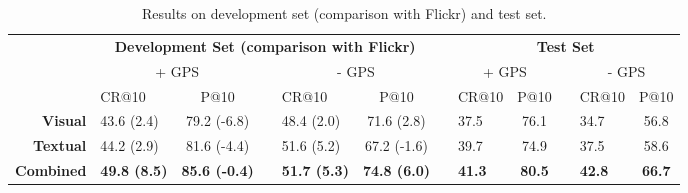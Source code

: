 \documentclass{acm_proc_article-me11_tweaked}
\begin{document}
\begin{table*}
\centering
\caption{Results on development set (comparison with Flickr) and test set.}
 \begin{tabular}{|r|l|ccl|ccl|ccl|c|}
\cline{2-12}
   \multicolumn{1}{c|}{ } & \multicolumn{5}{c}{\bfseries Development Set (comparison with Flickr)}  & \vrule height2.75ex depth1.25ex width 1pt &  \multicolumn{5}{c|}{\bfseries Test Set} \\\cline{2-12}    
   \multicolumn{1}{c|}{ } & \multicolumn{2}{c}{ + GPS}  & \vrule height2.75ex depth1.25ex width 1pt & \multicolumn{2}{c}{ - GPS} & \vrule height2.75ex depth1.25ex width 1pt & \multicolumn{2}{c}{ + GPS}  & \vrule height2.75ex depth1.25ex width 1pt & \multicolumn{2}{c|}{ - GPS} \\\cline{2-12}
   \multicolumn{1}{c|}{ } &  CR@10 &   P@10 & \vrule height2.75ex depth1.25ex width 1pt &  CR@10 &  P@10 & \vrule height2.75ex depth1.25ex width 1pt &  CR@10 &   P@10 & \vrule height2.75ex depth1.25ex width 1pt &   CR@10 &  P@10 \\
   \hline
   \bfseries Visual   & 43.6  (2.4) & 79.2 (-6.8) & \vrule height2.75ex depth1.25ex width 1pt & 48.4 (2.0)&  71.6 (2.8)& \vrule height2.75ex depth1.25ex width 1pt & 37.5 & 76.1 & \vrule height2.75ex depth1.25ex width 1pt & 34.7 & 56.8\\\hline
  \bfseries Textual  &  44.2  (2.9)  & 81.6 (-4.4) & \vrule height2.75ex depth1.25ex width 1pt & 51.6 (5.2) & 67.2 (-1.6)& \vrule height2.75ex depth1.25ex width 1pt &  39.7  & 74.9 & \vrule height2.75ex depth1.25ex width 1pt & 37.5 & 58.6\\\hline
  \bfseries Combined & \bfseries 49.8  (8.5) & \bfseries 85.6 (-0.4) & \vrule height2.75ex depth1.25ex width 1pt & \bfseries  51.7 (5.3)  & \bfseries 74.8  (6.0)& \vrule height2.75ex depth1.25ex width 1pt  & \bfseries 41.3 & \bfseries 80.5 & \vrule height2.75ex depth1.25ex width 1pt & \bfseries  42.8  & \bfseries 66.7 \\
    \hline
  \end{tabular}
  \label{tbl:results}

  
  
\end{table*} 
\end{document}

